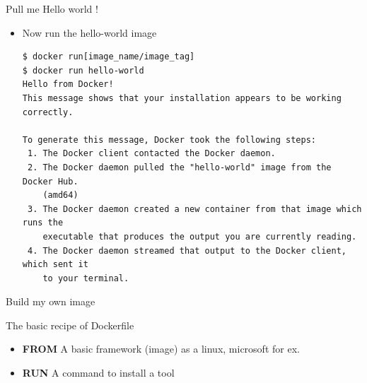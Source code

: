 \begin{frame}[fragile]{Pull me Hello world !}
\begin{itemize}
\item Now run the hello-world image
\begin{verbatim}
$ docker run[image_name/image_tag]
$ docker run hello-world
Hello from Docker!
This message shows that your installation appears to be working correctly.

To generate this message, Docker took the following steps:
 1. The Docker client contacted the Docker daemon.
 2. The Docker daemon pulled the "hello-world" image from the Docker Hub.
    (amd64)
 3. The Docker daemon created a new container from that image which runs the
    executable that produces the output you are currently reading.
 4. The Docker daemon streamed that output to the Docker client, which sent it
    to your terminal.
\end{verbatim}
\end{itemize}
\end{frame}

\begin{frame}{Build my own image}
\begin{block}{The basic recipe of Dockerfile}
\begin{itemize}
\item \textbf{FROM} A basic framework (image) as a linux, microsoft for ex. 
\item \textbf{RUN} A command to install a tool
\end{itemize}
\end{block}
\end{frame}

